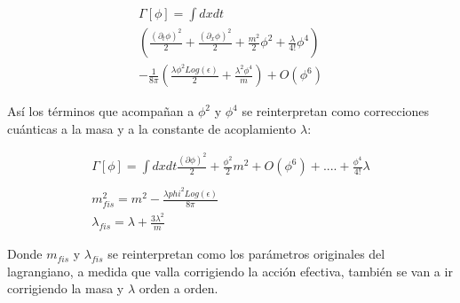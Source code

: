 \begin{comment}

\begin{equation}
\begin{array}{c}
\int _ { \epsilon } ^{\infty} \frac{ dt}{t} 
e ^{- t m ^2 }
Tr \  e ^{- t ( - \partial ^2 + \frac{\lambda}{2} \phi ^2 ) } = \\
\int _ { \epsilon } ^{1} \frac{ dt}{t} 
e ^{- t m ^2 }
Tr \  e ^{- t ( - \partial ^2 + \frac{\lambda}{2} \phi ^2 ) } + 
\int _ { 1 } ^{\infty} \frac{ dt}{t} 
Tr \  e ^{- t ( - \partial ^2 + m^2 + \frac{\lambda}{2} \phi ^2 ) }

\end{array}
\end{equation}

\end{comment}



\begin{equation}
\begin{array}{c}
\Gamma [ \phi ] = 
\int dx dt  \\
\left(
\frac{( \partial _t \phi ) ^2}{2} +  
\frac{( \partial _x \phi ) ^2}{2} +
\frac{m ^2 }{2} \phi ^2 +
\frac{\lambda}{4!} \phi ^4 
						\right)  \\
- \frac{1}{8 \pi}
\left(
	\frac{\lambda \phi ^2 Log( \epsilon )}{2}  + \frac{ \lambda ^2 \phi ^4 }{m}
	\right) + O ( \phi ^6)

\end{array}
\end{equation}

Así los términos que acompañan a $\phi ^2 $ y $\phi ^4 $ se reinterpretan como correcciones cuánticas a la masa y a la constante de acoplamiento $\lambda $:

\begin{equation}
\begin{array}{c}

\Gamma [ \phi ] = 
\int dx dt 
\frac{ ( \partial \phi ) ^2 }{2 } +
\frac{\phi ^2}{2} m ^2 + O ( \phi ^6 ) + .... 
+ \frac{\phi ^4}{4!} \lambda \\ \\
m ^2 _{fis} = m ^2 - \frac{\lambda phi ^2 Log( \epsilon )}{8 \pi} \\
\lambda _{fis} = \lambda + \frac{3 \lambda ^2}{m} 


\end{array}
\end{equation}

Donde $m _{fis}$ y $ \lambda _{fis} $ se reinterpretan como los parámetros originales del lagrangiano, a medida que valla corrigiendo la acción efectiva, también se van a ir corrigiendo la masa y $\lambda $ orden a orden.

